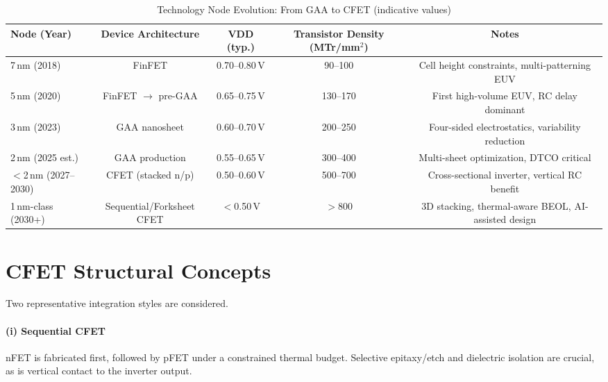 \documentclass[conference]{IEEEtran}
\begin{document}
\begin{table*}[t]
\centering
\caption{Technology Node Evolution: From GAA to CFET (indicative values)}
\label{tab:node_scaling}
\begin{tabular}{lcccc}
\hline
\textbf{Node (Year)} & \textbf{Device Architecture} & \textbf{VDD (typ.)} & \textbf{Transistor Density (MTr/mm$^2$)} & \textbf{Notes} \\
\hline
7\,nm (2018)  & FinFET              & 0.70--0.80\,V & 90--100   & Cell height constraints, multi-patterning EUV \\
5\,nm (2020)  & FinFET $\rightarrow$ pre-GAA & 0.65--0.75\,V & 130--170  & First high-volume EUV, RC delay dominant \\
3\,nm (2023)  & GAA nanosheet       & 0.60--0.70\,V & 200--250  & Four-sided electrostatics, variability reduction \\
2\,nm (2025 est.) & GAA production   & 0.55--0.65\,V & 300--400  & Multi-sheet optimization, DTCO critical \\
$<$2\,nm (2027--2030) & CFET (stacked n/p) & 0.50--0.60\,V & 500--700  & Cross-sectional inverter, vertical RC benefit \\
1\,nm-class (2030+) & Sequential/Forksheet CFET & $<$0.50\,V & $>$800 & 3D stacking, thermal-aware BEOL, AI-assisted design \\
\hline
\end{tabular}
\end{table*}

\section{CFET Structural Concepts}
Two representative integration styles are considered.

\paragraph*{(i) Sequential CFET}
nFET is fabricated first, followed by pFET under a constrained thermal budget. Selective epitaxy/etch and dielectric isolation are crucial, as is vertical contact to the inverter output.
\end{document}
